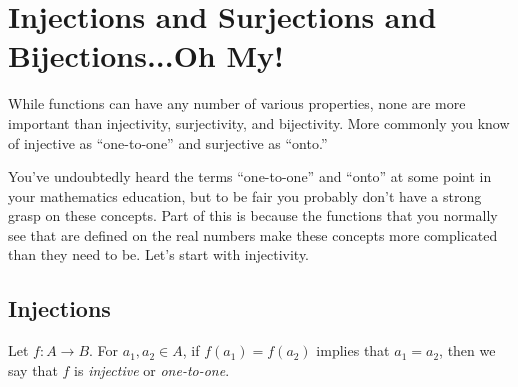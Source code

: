 \chapter[Injections, Surjections, \& Bijections]{Injections and Surjections and Bijections...Oh My!}

While functions can have any number of various properties, none are more important than injectivity, surjectivity, and bijectivity.  More commonly you know of injective as ``one-to-one'' and surjective as ``onto.''

\begin{center}
\end{center}

You've undoubtedly heard the terms ``one-to-one'' and ``onto'' at some point in your mathematics education, but to be fair you probably don't have a strong grasp on these concepts.  Part of this is because the functions that you normally see that are defined on the real numbers make these concepts more complicated than they need to be.  Let's start with injectivity.


\section{Injections}
\begin{definition}  Let $f: A \to B$.  For $a_1,a_2 \in A$, if $f(a_1)=f(a_2)$ implies that $a_1=a_2$, then we say that $f$ is \textit{injective} or \textit{one-to-one}.
\end{definition}

